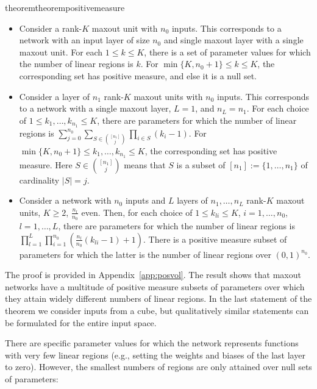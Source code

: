 \documentclass{article}
\theoremstyle{definition}
\begin{document}
\begin{restatable}{theorem}{theorempositivemeasure}
\label{thm:positive_measure}
\hspace{1em}
    \begin{itemize}[leftmargin=*]
    \item 
    Consider a rank-$K$ maxout unit with $n_0$ inputs. This corresponds to a network with an input layer of size $n_0$ and single maxout layer with a single maxout unit. 
    For each $1\leq k\leq K$, there is a set of parameter values for which the number of linear regions is $k$. For $\min\{K, n_0+1\}\leq k\leq K$, the corresponding set has positive measure, and else it is a null set. 
    \item 
    Consider a layer of $n_1$ rank-$K$ maxout units with $n_0$ inputs. This corresponds to a network with a single maxout layer, $L=1$, and $n_L=n_1$. 
    For each choice of $1\leq k_1,\ldots, k_{n_1} \leq K$, there are parameters for which the number of linear regions is $\sum_{j=0}^{n_0} \sum_{S \in {\binom{[n_1]}{j}}}\prod_{i\in S}(k_i-1)$.
    For $\min\{K,n_0+1\}\leq k_1,\ldots, k_{n_1}\leq K$, the corresponding set has positive measure. Here $S \in \binom{[n_1]}{j}$ means that $S$ is a subset of $[n_1]:=\{1,\ldots, n_1\}$ of cardinality $|S|=j$. 
    \item 
    Consider a network with $n_0$ inputs and $L$ layers of $n_1,\ldots, n_L$ rank-$K$ maxout units, $K\geq 2$, $\frac{n_l}{n_0}$ even. 
    Then, for each choice of $1\leq k_{li}\leq K$, $i=1,\ldots, n_0$, $l=1,\ldots, L$, there are parameters for which the number of linear regions is $\prod_{l=1}^{L} \prod_{i=1}^{n_0}(\frac{n_l}{n_0} (k_{li}-1)+1)$. 
    There is a positive measure subset of parameters for which the latter is the number of linear regions over $(0,1)^{n_0}$. 
    \end{itemize}
\end{restatable}

The proof is provided in Appendix~\ref{app:posvol}.
The result shows that maxout networks have a multitude of positive measure subsets of parameters over which they attain widely different numbers of linear regions. 
In the last statement of the theorem we consider inputs from a cube, but  qualitatively similar statements can be formulated for the entire input space. 

There are specific parameter values for which the network represents functions with very few linear regions (e.g., setting the weights and biases of the last layer to zero). However, the smallest numbers of regions are only attained over null sets of parameters: 
\end{document}
